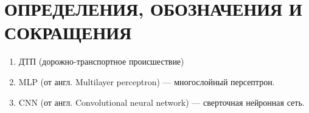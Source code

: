 \section*{ОПРЕДЕЛЕНИЯ, ОБОЗНАЧЕНИЯ И СОКРАЩЕНИЯ}
\begin{enumerate}[leftmargin=1.6\parindent]
	\item ДТП (дорожно-транспортное происшествие)
	\item MLP (от англ. Multilayer perceptron) --- многослойный персептрон.
	\item CNN (от англ. Convolutional neural network) --- сверточная нейронная сеть. 
\end{enumerate}

\pagebreak